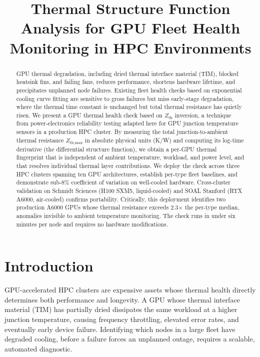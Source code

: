 \documentclass[conference]{IEEEtran}
\title{Thermal Structure Function Analysis for GPU Fleet Health
       Monitoring in HPC Environments}
\author{
  \IEEEauthorblockN{Sonnet Xu}
  \IEEEauthorblockA{Stanford University\\
    sonnet@stanford.edu}
}
\begin{document}
\maketitle

\begin{abstract}
GPU thermal degradation, including dried thermal interface material
(TIM), blocked heatsink fins, and failing fans, reduces performance,
shortens hardware lifetime, and precipitates unplanned node failures.
Existing fleet health checks based on exponential cooling curve
fitting are sensitive to gross failures but miss early-stage
degradation, where the thermal time constant is unchanged but total
thermal resistance has quietly risen.
We present a GPU thermal health check based on $Z_\text{th}$
inversion, a technique from power-electronics reliability testing
adapted here for GPU junction temperature sensors in a production HPC
cluster.
By measuring the total junction-to-ambient thermal resistance
$Z_\text{th,max}$ in absolute physical units (K/W) and computing its
log-time derivative (the differential structure function), we
obtain a per-GPU thermal fingerprint that is independent of ambient
temperature, workload, and power level, and that resolves individual
thermal layer contributions.
We deploy the check across three HPC clusters spanning ten GPU
architectures, establish per-type fleet baselines, and demonstrate
sub-8\% coefficient of variation on well-cooled hardware.
Cross-cluster validation on Schmidt Sciences (H100 SXM5, liquid-cooled)
and SOAL Stanford (RTX A6000, air-cooled) confirms portability.
Critically, this deployment identifies two production A6000 GPUs
whose thermal resistance exceeds 2.3$\times$ the per-type median,
anomalies invisible to ambient temperature monitoring.
The check runs in under six minutes per node and requires no hardware
modifications.
\end{abstract}

\section{Introduction}
\label{sec:intro}

GPU-accelerated HPC clusters are expensive assets whose thermal health
directly determines both performance and longevity.
A GPU whose thermal interface material (TIM) has partially dried
dissipates the same workload at a higher junction temperature, causing
frequency throttling, elevated error rates, and eventually early
device failure.
Identifying which nodes in a large fleet have degraded cooling,
before a failure forces an unplanned outage, requires a scalable,
automated diagnostic.
\end{document}
